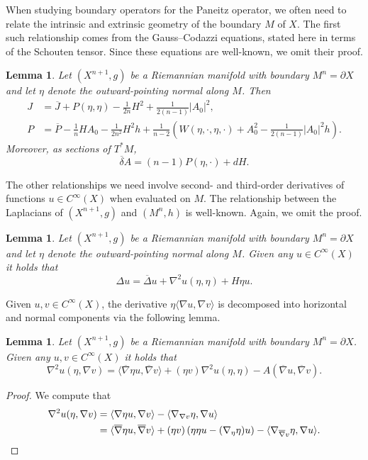 \documentclass{amsart}
\newtheorem{lem}[thm]{Lemma}
\theoremstyle{definition}
\theoremstyle{remark}
\numberwithin{equation}{section}
\begin{document}
When studying boundary operators for the Paneitz operator, we often need to relate the intrinsic and extrinsic geometry of the boundary $M$ of $X$.  The first such relationship comes from the Gauss--Codazzi equations, stated here in terms of the Schouten tensor.  Since these equations are well-known, we omit their proof.

\begin{lem}
 \label{lem:gauss_codazzi}
 Let $(X^{n+1},g)$ be a Riemannian manifold with boundary $M^n=\partial X$ and let $\eta$ denote the outward-pointing normal along $M$.  Then
 \begin{align*}
  J & = {\overline{J}} + P(\eta,\eta) - \frac{1}{2n}H^2 + \frac{1}{2(n-1)}{\lvert} A_0{\rvert}^2 , \\
  P & = {\overline{P}} - \frac{1}{n}HA_0 - \frac{1}{2n^2}H^2h + \frac{1}{n-2}\left(W(\eta,\cdot,\eta,\cdot) + A_0^2 - \frac{1}{2(n-1)}{\lvert} A_0{\rvert}^2 h\right) .
 \end{align*}
 Moreover, as sections of $T^\ast M$,
 \[ {\overline{\delta}} A = (n-1)P(\eta,\cdot) + dH . \]
\end{lem}

The other relationships we need involve second- and third-order derivatives of functions $u\in C^\infty(X)$ when evaluated on $M$.  The relationship between the Laplacians of $(X^{n+1},g)$ and $(M^n,h)$ is well-known.  Again, we omit the proof.

\begin{lem}
 \label{lem:2derivatives}
 Let $(X^{n+1},g)$ be a Riemannian manifold with boundary $M^n=\partial X$ and let $\eta$ denote the outward-pointing normal along $M$.  Given any $u\in C^\infty(X)$ it holds that
 \[ \Delta u = {\overline{\Delta}} u + \nabla^2u(\eta,\eta) + H\eta u . \]
\end{lem}

Given $u,v\in C^\infty(X)$, the derivative $\eta{\langle}\nabla u,\nabla v{\rangle}$ is decomposed into horizontal and normal components via the following lemma.

\begin{lem}
 \label{lem:derivatives_eta}
 Let $(X^{n+1},g)$ be a Riemannian manifold with boundary $M^n=\partial X$.  Given any $u,v\in C^\infty(X)$ it holds that
 \[ \nabla^2u(\eta,\nabla v) = {\langle}{\overline{\nabla}}\eta u,{\overline{\nabla}} v{\rangle} + (\eta v)\nabla^2u(\eta,\eta) - A({\overline{\nabla}} u,{\overline{\nabla}} v) . \]
\end{lem}

\begin{proof}
 We compute that
 \begin{align*}
  \nabla^2u(\eta,\nabla v) & = {\langle}\nabla\eta u,\nabla v{\rangle} - {\langle}\nabla_{\nabla v}\eta,\nabla u{\rangle} \\
  & = {\langle}{\overline{\nabla}}\eta u,{\overline{\nabla}} v{\rangle} + (\eta v)\left(\eta\eta u - (\nabla_\eta\eta)u\right) - {\langle}\nabla_{{\overline{\nabla}} v}\eta,\nabla u{\rangle} . \qedhere
 \end{align*}
\end{proof}
\end{document}
